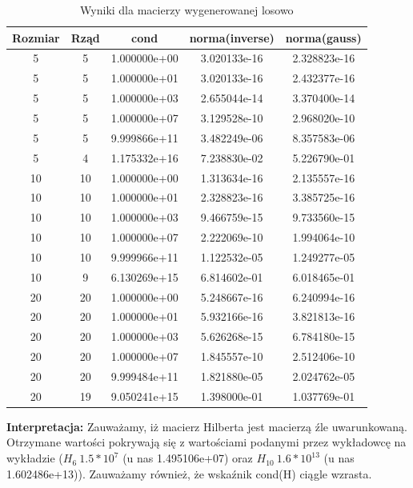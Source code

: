 \documentclass[a4paper,14pt]{report}
\begin{document}
    \begin{table}[H]
    \centering
    \begin{tabular}{|c | c | c | c | c |} 
     \hline
     Rozmiar & Rząd & cond & norma(inverse) & norma(gauss) \\ [0.5ex] 
     \hline\hline
     5 & 5 & 1.000000e+00 & 3.020133e-16 & 2.328823e-16 \\
     5 & 5 & 1.000000e+01 & 3.020133e-16 & 2.432377e-16 \\
     5 & 5 & 1.000000e+03 & 2.655044e-14 & 3.370400e-14 \\
     5 & 5 & 1.000000e+07 & 3.129528e-10 & 2.968020e-10 \\
     5 & 5 & 9.999866e+11 & 3.482249e-06 & 8.357583e-06 \\
     5 & 4 & 1.175332e+16 & 7.238830e-02 & 5.226790e-01 \\
     10 & 10 & 1.000000e+00 & 1.313634e-16 & 2.135557e-16 \\
     10 & 10 & 1.000000e+01 & 2.328823e-16 & 3.385725e-16 \\
     10 & 10 & 1.000000e+03 & 9.466759e-15 & 9.733560e-15 \\
     10 & 10 & 1.000000e+07 & 2.222069e-10 & 1.994064e-10 \\
     10 & 10 & 9.999966e+11 & 1.122532e-05 & 1.249277e-05 \\
     10 & 9 & 6.130269e+15 & 6.814602e-01 & 6.018465e-01 \\
     20 & 20 & 1.000000e+00 & 5.248667e-16 & 6.240994e-16 \\
     20 & 20 & 1.000000e+01 & 5.932166e-16 & 3.821813e-16 \\
     20 & 20 & 1.000000e+03 & 5.626268e-15 & 6.784180e-15 \\
     20 & 20 & 1.000000e+07 & 1.845557e-10 & 2.512406e-10 \\
     20 & 20 & 9.999484e+11 & 1.821880e-05 & 2.024762e-05 \\
     20 & 19 & 9.050241e+15 & 1.398000e-01 & 1.037769e-01 \\
     \hline
    \end{tabular}
    \caption{Wyniki dla macierzy wygenerowanej losowo}
    \label{Zad3Random}
    \end{table}
    \textbf{Interpretacja: } Zauważamy, iż macierz Hilberta jest macierzą źle uwarunkowaną. Otrzymane wartości pokrywają się z wartościami podanymi przez wykładowcę na wykładzie ($ H_{6} ~ 1.5*10^{7} $ (u nas 1.495106e+07) oraz $ H_{10} ~ 1.6*10^{13} $ (u nas 1.602486e+13)). Zauważamy również, że wskaźnik cond(H) ciągle wzrasta.
\end{document}
